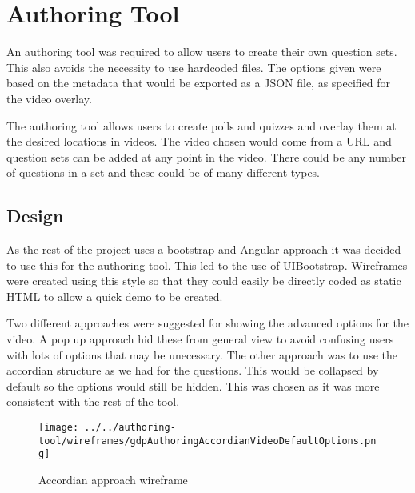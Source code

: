 \chapter{Authoring Tool} \label{Chapter:Authoring Tool}
An authoring tool was required to allow users to create their own question sets. This also avoids the necessity to use hardcoded files. The options given were based on the metadata that would be exported as a JSON file, as specified for the video overlay.

The authoring tool allows users to create polls and quizzes and overlay them at the desired locations in videos. The video chosen would come from a URL and question sets can be added at any point in the video. There could be any number of questions in a set and these could be of many different types.
\section{Design} \label{Section:Design}
As the rest of the project uses a bootstrap and Angular approach it was decided to use this for the authoring tool. This led to the use of UIBootstrap. Wireframes were created using this style so that they could easily be directly coded as static HTML to allow a quick demo to be created. 

Two different approaches were suggested for showing the advanced options for the video. A pop up approach hid these from general view to avoid confusing users with lots of options that may be unecessary. The other approach was to use the accordian structure as we had for the questions. This would be collapsed by default so the options would still be hidden. This was chosen as it was more consistent with the rest of the tool.

\begin{figure}[h]
	\centering 
	\texttt{[image: ../../authoring-tool/wireframes/gdpAuthoringAccordianVideoDefaultOptions.png]} 	
	\caption{\label{fig:sift} Accordian approach wireframe } 	
\end{figure}